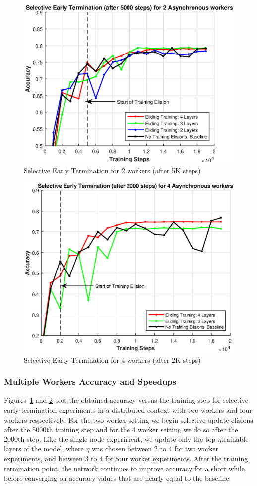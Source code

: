 \begin{figure}[t]
	\centering
	\includegraphics[width=0.8\columnwidth]{figures/fig8.eps}
	\caption{Selective Early Termination for 2 workers (after 5K steps)}
	\label{fig:fig8}
\end{figure}
\begin{figure}[t]
	\centering
	\includegraphics[width=0.8\columnwidth]{figures/fig9.eps}
	\caption{Selective Early Termination for 4 workers (after 2K steps)}
	\label{fig:fig9}
\end{figure}
\subsubsection{Multiple Workers Accuracy and Speedups}
Figures~\ref{fig:fig8} and \ref{fig:fig9} plot the obtained accuracy versus the training step for selective early termination experiments in a distributed context with two workers and four workers respectively. For the two worker setting we begin selective update elisions after the 5000th training step and for the 4 worker setting we do so after the 2000th step. Like the single node experiment, we update only the top $\eta$trainable layers of the model, where $\eta$ was chosen between $2$ to $4$ for two worker experiments, and between $3$ to $4$ for four worker experiments. After the training termination point, the network continues to improve accuracy for a short while, before converging on accuracy values that are nearly equal to the baseline. 

